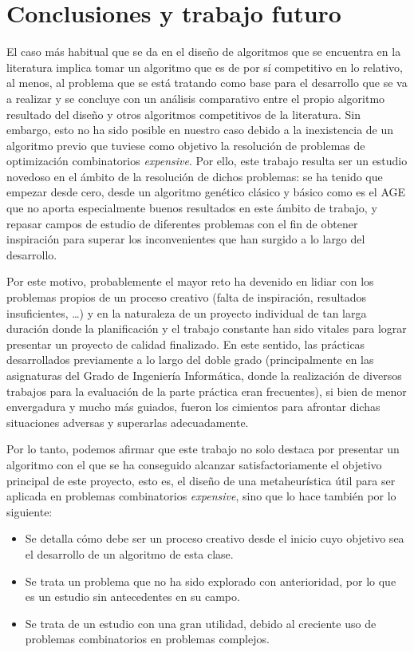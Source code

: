 \chapter{Conclusiones y trabajo futuro}

El caso más habitual que se da en el diseño de algoritmos que se encuentra en la literatura implica tomar un algoritmo que es de por sí competitivo en lo relativo, al menos, al problema que se está tratando como base para el desarrollo que se va a realizar y se concluye con un análisis comparativo entre el propio algoritmo resultado del diseño y otros algoritmos competitivos de la literatura. 
Sin embargo, esto no ha sido posible en nuestro caso debido a la inexistencia de un algoritmo previo que tuviese como objetivo la resolución de problemas de optimización combinatorios \textit{expensive}. 
Por ello, este trabajo resulta ser un estudio novedoso en el ámbito de la resolución de dichos problemas: se ha tenido que empezar desde cero, desde un algoritmo genético clásico y básico como es el AGE que no aporta especialmente buenos resultados en este ámbito de trabajo, y repasar campos de estudio de diferentes problemas con el fin de obtener inspiración para superar los inconvenientes que han surgido a lo largo del desarrollo. 

Por este motivo, probablemente el mayor reto ha devenido en lidiar con los problemas propios de un proceso creativo (falta de inspiración, resultados insuficientes, \dots) y en la naturaleza de un proyecto individual de tan larga duración donde la planificación y el trabajo constante han sido vitales para lograr presentar un proyecto de calidad finalizado. 
En este sentido, las prácticas desarrollados previamente a lo largo del doble grado (principalmente en las asignaturas del Grado de Ingeniería Informática, donde la realización de diversos trabajos para la evaluación de la parte práctica eran frecuentes), si bien de menor envergadura y mucho más guiados, fueron los cimientos para afrontar dichas situaciones adversas y superarlas adecuadamente. 

Por lo tanto, podemos afirmar que este trabajo no solo destaca por presentar un algoritmo con el que se ha conseguido alcanzar satisfactoriamente el objetivo principal de este proyecto, esto es, el diseño de una metaheurística útil para ser aplicada en problemas combinatorios \textit{expensive}, sino que lo hace también por lo siguiente:

\begin{itemize}
	\item Se detalla cómo debe ser un proceso creativo desde el inicio cuyo objetivo sea el desarrollo de un algoritmo de esta clase.
	
	\item Se trata un problema que no ha sido explorado con anterioridad, por lo que es un estudio sin antecedentes en su campo.
	
	\item Se trata de un estudio con una gran utilidad, debido al creciente uso de problemas combinatorios en problemas complejos. 
\end{itemize}

